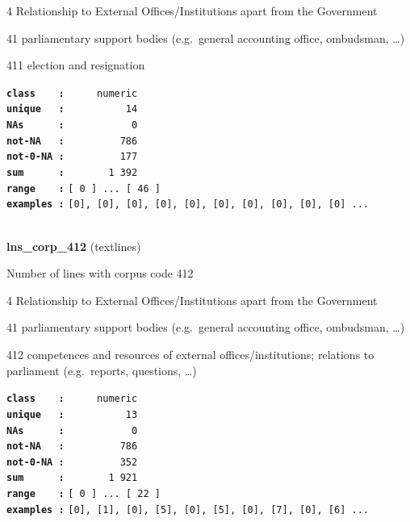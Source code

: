 \documentclass[]{article}
\begin{document}
4 Relationship to External Offices/Institutions apart from the
Government

41 parliamentary support bodies (e.g.~general accounting office,
ombudsman, \ldots{})

411 election and resignation

\textbf{\texttt{class\ \ \ \ :}} \texttt{~~~~~numeric}\\
\textbf{\texttt{unique\ \ \ :}} \texttt{~~~~~~~~~~14}\\
\textbf{\texttt{NAs\ \ \ \ \ \ :}} \texttt{~~~~~~~~~~~0}\\
\textbf{\texttt{not-NA\ \ \ :}} \texttt{~~~~~~~~~786}\\
\textbf{\texttt{not-0-NA\ :}} \texttt{~~~~~~~~~177}\\
\textbf{\texttt{sum\ \ \ \ \ \ :}} \texttt{~~~~~~~1~392}\\
\textbf{\texttt{range\ \ \ \ :}}
\texttt{{[}\ 0\ {]}\ ...\ {[}\ 46\ {]}}\\
\textbf{\texttt{examples\ :}}
\texttt{{[}0{]},\ {[}0{]},\ {[}0{]},\ {[}0{]},\ {[}0{]},\ {[}0{]},\ {[}0{]},\ {[}0{]},\ {[}0{]},\ {[}0{]}\ ...}\\

~

\textbf{lns\_corp\_412} (textlines)

Number of lines with corpus code 412

4 Relationship to External Offices/Institutions apart from the
Government

41 parliamentary support bodies (e.g.~general accounting office,
ombudsman, \ldots{})

412 competences and resources of external offices/institutions;
relations to parliament (e.g.~reports, questions, \ldots{})

\textbf{\texttt{class\ \ \ \ :}} \texttt{~~~~~numeric}\\
\textbf{\texttt{unique\ \ \ :}} \texttt{~~~~~~~~~~13}\\
\textbf{\texttt{NAs\ \ \ \ \ \ :}} \texttt{~~~~~~~~~~~0}\\
\textbf{\texttt{not-NA\ \ \ :}} \texttt{~~~~~~~~~786}\\
\textbf{\texttt{not-0-NA\ :}} \texttt{~~~~~~~~~352}\\
\textbf{\texttt{sum\ \ \ \ \ \ :}} \texttt{~~~~~~~1~921}\\
\textbf{\texttt{range\ \ \ \ :}}
\texttt{{[}\ 0\ {]}\ ...\ {[}\ 22\ {]}}\\
\textbf{\texttt{examples\ :}}
\texttt{{[}0{]},\ {[}1{]},\ {[}0{]},\ {[}5{]},\ {[}0{]},\ {[}5{]},\ {[}0{]},\ {[}7{]},\ {[}0{]},\ {[}6{]}\ ...}\\
\end{document}
